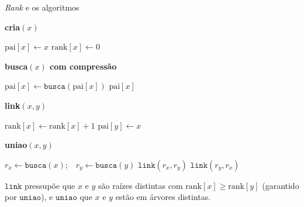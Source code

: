 \documentclass[aspectratio=169,10pt]{beamer}
\newcommand{\Busca}{\mathtt{busca}}
\newcommand{\Uniao}{\mathtt{uniao}}
\newcommand{\Link}{\mathtt{link}}
\begin{document}
\begin{frame}[t]{\textit{Rank} e os algoritmos}
  
  \begin{minipage}[t]{.43\linewidth}
    \textbf{cria$(x)$}
    \begin{algorithmic}[1]
      \State $\mathrm{pai}[x]\gets x$
      \State $\mathrm{rank}[x]\gets0$
    \end{algorithmic}
  \end{minipage}
  \hfill
  \begin{minipage}[t]{.53\linewidth}
    \textbf{busca$(x)$ com compressão}
    \begin{algorithmic}[1]
      \State $\mathrm{pai}[x]\gets\Busca(\mathrm{pai}[x])$
      \EndIf
      \State \Return $\mathrm{pai}[x]$
    \end{algorithmic}
  \end{minipage}

  \bigskip
  \begin{minipage}[t]{.43\linewidth}
    \textbf{link$(x,y)$}
    \begin{algorithmic}[1]
      \State $\mathrm{rank}[x]\gets\mathrm{rank}[x]+1$
      \EndIf
      \State $\mathrm{pai}[y]\gets x$
    \end{algorithmic}
  \end{minipage}
  \hfill
  \begin{minipage}[t]{.53\linewidth}
    \textbf{uniao$(x,y)$}
    \begin{algorithmic}[1]
      \State $r_x\gets\Busca(x)$;\ \ $r_y\gets\Busca(y)$
      \State $\Link(r_x,r_y)$
      \Else
      \State $\Link(r_y,r_x)$
      \EndIf
    \end{algorithmic}
  \end{minipage}

  \bigskip
  $\Link$ pressupõe que $x$ e $y$ são raízes distintas com
  $\mathrm{rank}[x]\geq\mathrm{rank}[y]$ (garantido por $\Uniao$), e
  $\Uniao$ que $x$ e $y$ estão em árvores distintas.
\end{frame}
\end{document}
